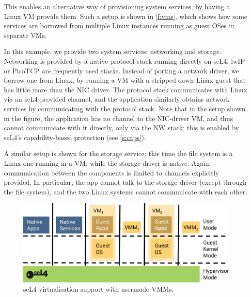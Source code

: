 \documentclass[english,a4paper,12pt]{report}
\begin{document}
  This enables an alternative way of provisioning system services, by
  having a Linux VM provide them. Such a setup is shown in
  \autoref{f:vms}, which shows how some services are borrowed from
  multiple Linux instances running as guest OSes in separate VMs.

  In this example, we provide two system services: networking and
  storage. Networking is provided by a native protocol stack
  running directly on seL4, lwIP or PicoTCP are frequently used
  stacks. Instead of porting a network driver, we borrow one from
  Linux, by running a VM with a stripped-down Linux guest that has
  little more than the NIC driver. The protocol stack communicates
  with Linux via an seL4-provided channel, and the application
  similarly obtains network services by communicating with the
  protocol stack. Note that in the setup shown in the figure, the
  application has no channel to the NIC-driver VM, and thus cannot
  communicate with it directly, only via the NW stack; this is enabled
  by seL4's capability-based protection (see \autoref{s:caps}).

  A similar setup is shown for the storage service; this time the
  file system is a Linux one running in a VM, while the storage
  driver is native. Again, communication between the components is
  limited to  channels explicitly provided. In particular, the app
  cannot talk to the storage driver (except through the file system),
  and the two Linux systems cannot communicate with each other.

  \begin{figure}[b]
    \centering
    \includegraphics{vmm}
    \caption{seL4 virtualisation support with usermode VMMs.}
    \label{f:vmm}
  \end{figure}
\end{document}
